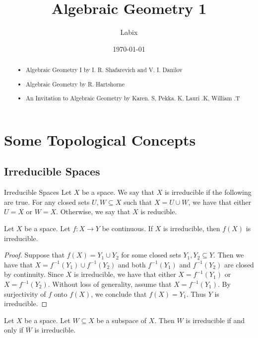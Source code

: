 \documentclass[a4paper]{article}
\title{Algebraic Geometry 1}
\author{Labix}
\date{\today}
\begin{document}
\maketitle
\begin{abstract}
\begin{itemize}
\item Algebraic Geometry I by I. R. Shafarevich and V. I. Danilov
\item Algebraic Geometry by R. Hartshorne
\item An Invitation to Algebraic Geometry by Karen. S, Pekka. K, Lauri .K, William .T
\end{itemize}
\end{abstract}
\pagebreak
\tableofcontents

\pagebreak
\section{Some Topological Concepts}
\subsection{Irreducible Spaces}
\begin{defn}{Irreducible Spaces}{} Let $X$ be a space. We say that $X$ is irreducible if the following are true. For any closed sets $U,W\subseteq X$ such that $X=U\cup W$, we have that either $U=X$ or $W=X$. Otherwise, we say that $X$ is reducible. 
\end{defn}

\begin{prp}{}{} Let $X$ be a space. Let $f:X\to Y$ be continuous. If $X$ is irreducible, then $f(X)$ is irreducible. 
\begin{proof}
Suppose that $f(X)=Y_1\cup Y_2$ for some closed sets $Y_1,Y_2\subseteq Y$. Then we have that $X=f^{-1}(Y_1)\cup f^{-1}(Y_2)$ and both $f^{-1}(Y_1)$ and $f^{-1}(Y_2)$ are closed by continuity. Since $X$ is irreducible, we have that either $X=f^{-1}(Y_1)$ or $X=f^{-1}(Y_2)$. Without loss of generality, assume that $X=f^{-1}(Y_1)$. By surjectivity of $f$ onto $f(X)$, we conclude that $f(X)=Y_1$. Thus $Y$ is irreducible. 
\end{proof}
\end{prp}

\begin{lmm}{}{} Let $X$ be a space. Let $W\subseteq X$ be a subspace of $X$. Then $W$ is irreducible if and only if $\overline{W}$ is irreducible. 
\end{lmm}
\end{document}
